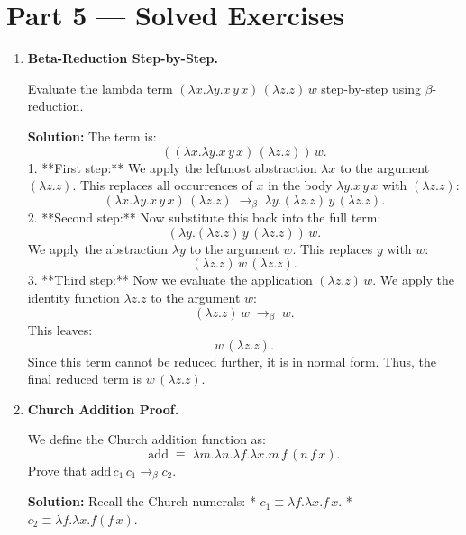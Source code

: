 \documentclass[12pt, a4paper]{book}
\begin{document}
\section{Part 5 --- Solved Exercises}

\begin{problembox}
\begin{enumerate}[label=\textbf{E\arabic*.}]
  \item \textbf{Beta-Reduction Step-by-Step.}
  
        Evaluate the lambda term $(\lambda x. \lambda y. x \, y \, x) \, (\lambda z. z) \, w$ step-by-step using $\beta$-reduction.
        
        \textbf{Solution:}
        The term is:
        \[
          \left( (\lambda x. \lambda y. x \, y \, x) \, (\lambda z. z) \right) \, w.
        \]
        1. **First step:** We apply the leftmost abstraction $\lambda x$ to the argument $(\lambda z. z)$.
           This replaces all occurrences of $x$ in the body $\lambda y. x \, y \, x$ with $(\lambda z. z)$:
           \[
             (\lambda x. \lambda y. x \, y \, x) \, (\lambda z. z) \;\to_\beta\; \lambda y. (\lambda z. z) \, y \, (\lambda z. z).
           \]
        2. **Second step:** Now substitute this back into the full term:
           \[
             \left( \lambda y. (\lambda z. z) \, y \, (\lambda z. z) \right) \, w.
           \]
           We apply the abstraction $\lambda y$ to the argument $w$.
           This replaces $y$ with $w$:
           \[
             (\lambda z. z) \, w \, (\lambda z. z).
           \]
        3. **Third step:** Now we evaluate the application $(\lambda z. z) \, w$.
           We apply the identity function $\lambda z. z$ to the argument $w$:
           \[
             (\lambda z. z) \, w \;\to_\beta\; w.
           \]
           This leaves:
           \[
             w \, (\lambda z. z).
           \]
        Since this term cannot be reduced further, it is in normal form.
        Thus, the final reduced term is $w \, (\lambda z. z)$.
        
  \item \textbf{Church Addition Proof.}
  
        We define the Church addition function as:
        \[
          \text{add} \;\equiv\; \lambda m. \lambda n. \lambda f. \lambda x. m \, f \, (n \, f \, x).
        \]
        Prove that $\text{add} \, c_1 \, c_1 \to_\beta c_2$.
        
        \textbf{Solution:}
        Recall the Church numerals:
        * $c_1 \equiv \lambda f. \lambda x. f \, x$.
        * $c_2 \equiv \lambda f. \lambda x. f (f \, x)$.
        

\end{enumerate}
\end{problembox}
\end{document}
